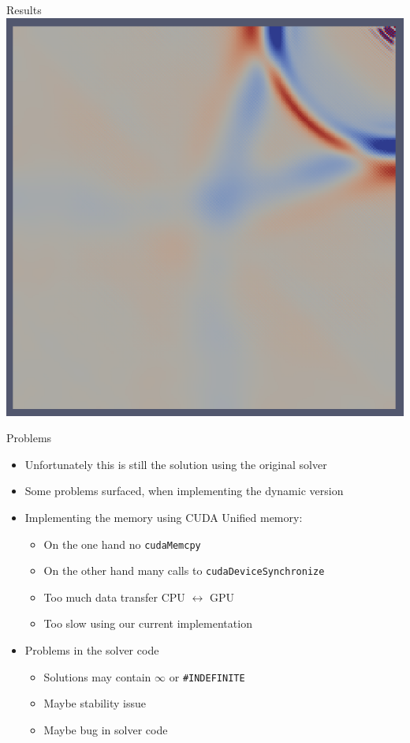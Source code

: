 \documentclass[fleqn,11pt,aspectratio=43]{beamer}
\begin{document}
	\begin{frame}{Results}
		\centering
		\includegraphics[height=\textheight]{res.png}
	\end{frame}
	
	\begin{frame}{Problems}
		\begin{itemize}
			\item Unfortunately this is still the solution using the original solver
			\item Some problems surfaced, when implementing the dynamic version
			\item Implementing the memory using CUDA Unified memory:
			\begin{itemize}
				\item On the one hand no \texttt{cudaMemcpy}
				\item On the other hand many calls to \texttt{cudaDeviceSynchronize}
				\item Too much data transfer CPU $\leftrightarrow$ GPU
				\item Too slow using our current implementation
			\end{itemize}
			\item Problems in the solver code
			\begin{itemize}
				\item Solutions may contain $\infty$ or \texttt{\#INDEFINITE}
				\item Maybe stability issue
				\item Maybe bug in solver code
			\end{itemize}
		\end{itemize}
	\end{frame}
\end{document}
